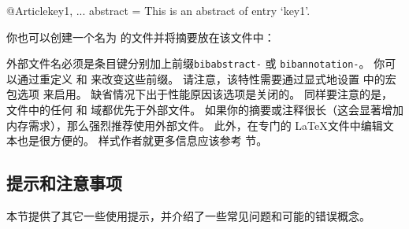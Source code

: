 \begin{ltxexample}[style=bibtex]
@Article{key1,
  ...
  abstract	  = {This is an abstract of entry `key1'.}
}
\end{ltxexample}
%
你也可以创建一个名为  的文件并将摘要放在该文件中：

%
外部文件名必须是条目键分别加上前缀\texttt{bibabstract-} 或 \texttt{bibannotation-}。
你可以通过重定义  和  来改变这些前缀。
请注意，该特性需要通过显式地设置  中的宏包选项  来启用。
缺省情况下出于性能原因该选项是关闭的。
同样要注意的是， 文件中的任何  和  域都优先于外部文件。
如果你的摘要或注释很长（这会显著增加内存需求），那么强烈推荐使用外部文件。
此外，在专门的 \LaTeX 文件中编辑文本也是很方便的。
样式作者就更多信息应该参考  节。

\subsection{提示和注意事项}
\label{use:cav}

本节提供了其它一些使用提示，并介绍了一些常见问题和可能的错误概念。

